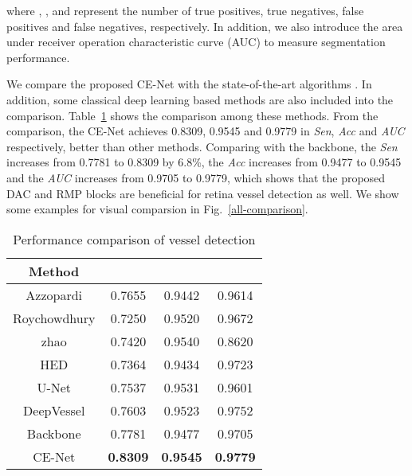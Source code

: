 \documentclass[journal]{IEEEtran}
\begin{document}
where , ,  and  represent the number of true positives, true negatives, false positives and false negatives, respectively. In addition, we also introduce the area under receiver operation characteristic curve (AUC)   to measure segmentation performance.

We compare the proposed CE-Net with the state-of-the-art algorithms \cite{zhao2015automated, azzopardi2015trainable, roychowdhury2015iterative}. In addition, some classical deep learning based methods \cite{xie2015holistically, ronneberger2015u, fu2016deepvessel} are also included into the comparison. 
Table~\ref{vessel} shows the comparison among these methods. 
From the comparison, the CE-Net achieves 0.8309, 0.9545  and 0.9779 in \textit{Sen}, \textit{Acc} and \textit{AUC} respectively, better than other methods. Comparing with the  backbone, the  \textit{Sen} increases from 0.7781 to 0.8309 by 6.8\%, the \textit{Acc} increases from 0.9477 to 0.9545 and  the \textit{AUC}  increases from 0.9705 to 0.9779, which shows that the proposed DAC and RMP blocks are beneficial for retina vessel detection as well. We show  some examples for visual comparsion  in Fig.~\ref{all-comparison}.
\begin{table}[h] 
	\normalsize
	\caption{Performance comparison of vessel detection} 
	\centering
	\begin{tabular}{c| c|c |c } \hline 
	Method &  &   &  \\ \hline
Azzopardi  \cite{azzopardi2015trainable} & 0.7655 & 0.9442& 0.9614\\ \hline
	Roychowdhury \cite{roychowdhury2015iterative}  & 0.7250 & 0.9520 &0.9672 \\ \hline
zhao \cite{zhao2015automated} & 0.7420 & 0.9540 & 0.8620 \\ \hline
	HED \cite{xie2015holistically} & 0.7364 & 0.9434  & 0.9723 \\  \hline
	U-Net \cite{ronneberger2015u} & 0.7537 &  0.9531 &  0.9601\\ \hline
	DeepVessel \cite{fu2016deepvessel} & 0.7603  & 0.9523 & 0.9752\\ \hline
	Backbone & 0.7781  & 0.9477 & 0.9705\\ \hline
	{CE-Net}  & \textbf{0.8309} & \textbf{0.9545} & \textbf{0.9779} \\ \hline
	\end{tabular}
	\label{vessel}
\end{table}
\end{document}
